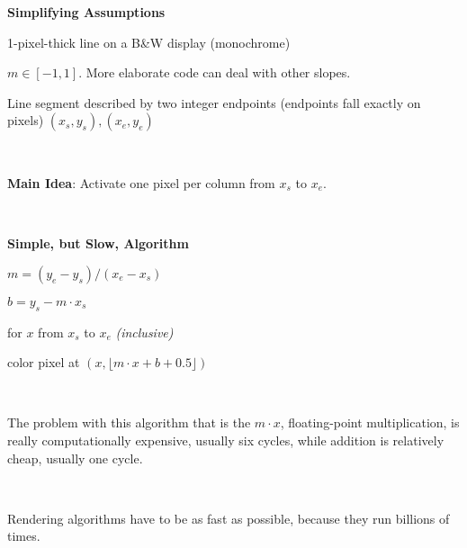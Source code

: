 \documentclass[12pt]{article}
\begin{document}
\begin{spacing}{1.2}
{\bf Simplifying Assumptions}

1-pixel-thick line on a B\&W display (monochrome)

$m \in [-1,1]$.  More elaborate code can deal with other slopes.

Line segment described by two integer endpoints (endpoints fall exactly on pixels) $(x_s,y_s), (x_e,y_e)$

\

\hfil{}

{\bf Main Idea}:  Activate one pixel per column from $x_s$ to $x_e$.  

\

\hfil{}

{\bf Simple, but Slow, Algorithm}

$m = (y_e - y_s) / (x_e - x_s)$

$b = y_s - m \cdot x_s$

for $x$ from $x_s$ to $x_e$ {\color{red} \it (inclusive)}

\qquad color pixel at $(x, \lfloor m \cdot x + b + 0.5 \rfloor)$

\

The problem with this algorithm that is the $m \cdot x$, floating-point multiplication, is really computationally expensive, usually six cycles, while addition is relatively cheap, usually one cycle.  

\

Rendering algorithms have to be as fast as possible, because they run billions of times.  


\end{spacing}
\end{document}
